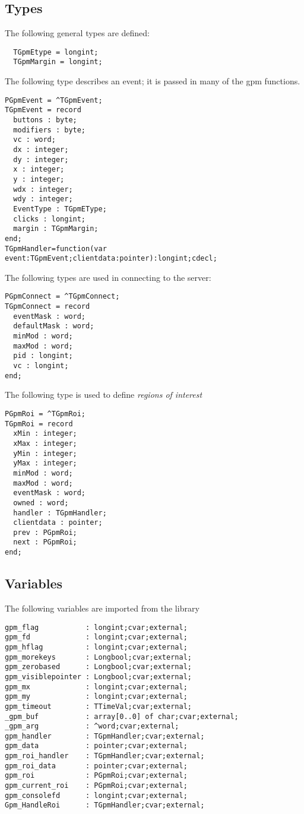 \subsection{Types}
The following general types are defined:
\begin{verbatim}
  TGpmEtype = longint;
  TGpmMargin = longint;
\end{verbatim}
The following type describes an event; it is passed in many of the gpm
functions.
\begin{verbatim}
PGpmEvent = ^TGpmEvent;
TGpmEvent = record
  buttons : byte;
  modifiers : byte;
  vc : word;
  dx : integer;
  dy : integer;
  x : integer;
  y : integer;
  wdx : integer;
  wdy : integer;
  EventType : TGpmEType;
  clicks : longint;
  margin : TGpmMargin;
end;
TGpmHandler=function(var event:TGpmEvent;clientdata:pointer):longint;cdecl;
\end{verbatim}
The following types are used in connecting to the  server:
\begin{verbatim}
PGpmConnect = ^TGpmConnect;
TGpmConnect = record
  eventMask : word;
  defaultMask : word;
  minMod : word;
  maxMod : word;
  pid : longint;
  vc : longint;
end;
\end{verbatim}
The following type is used to define {\em regions of interest}
\begin{verbatim}
PGpmRoi = ^TGpmRoi;
TGpmRoi = record
  xMin : integer;
  xMax : integer;
  yMin : integer;
  yMax : integer;
  minMod : word;
  maxMod : word;
  eventMask : word;
  owned : word;
  handler : TGpmHandler;
  clientdata : pointer;
  prev : PGpmRoi;
  next : PGpmRoi;
end;
\end{verbatim}

\subsection{Variables}
The following variables are imported from the  library
\begin{verbatim}
gpm_flag           : longint;cvar;external;
gpm_fd             : longint;cvar;external;
gpm_hflag          : longint;cvar;external;
gpm_morekeys       : Longbool;cvar;external;
gpm_zerobased      : Longbool;cvar;external;
gpm_visiblepointer : Longbool;cvar;external;
gpm_mx             : longint;cvar;external;
gpm_my             : longint;cvar;external;
gpm_timeout        : TTimeVal;cvar;external;
_gpm_buf           : array[0..0] of char;cvar;external;
_gpm_arg           : ^word;cvar;external;
gpm_handler        : TGpmHandler;cvar;external;
gpm_data           : pointer;cvar;external;
gpm_roi_handler    : TGpmHandler;cvar;external;
gpm_roi_data       : pointer;cvar;external;
gpm_roi            : PGpmRoi;cvar;external;
gpm_current_roi    : PGpmRoi;cvar;external;
gpm_consolefd      : longint;cvar;external;
Gpm_HandleRoi      : TGpmHandler;cvar;external;
\end{verbatim}

